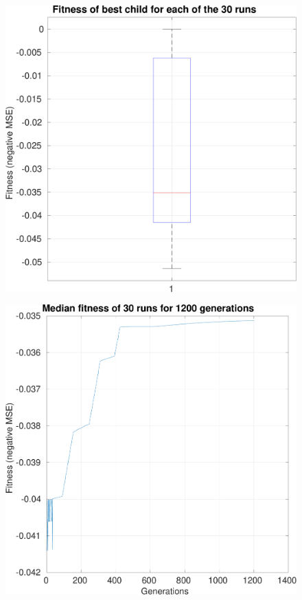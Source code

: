 \documentclass[paper=a4, fontsize=11pt]{scrartcl} %
\begin{document}
    \begin{figure}[h!]
        \centering
        \includegraphics[width=.9\linewidth]{a3-shapematch-0012-bestChildrenFitnessBoxplot}
        \label{fig:boxplot}
    \end{figure}
    \begin{figure}
        \centering
        \includegraphics[width=.9\linewidth]{a3-shapematch-0012-fitness}
        \label{fig:median}
    \end{figure}
\end{document}
